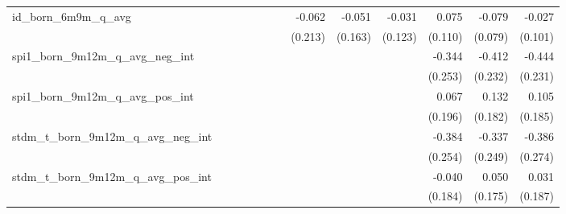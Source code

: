 \begin{tabular}{lrrrrrrrrrrrr}
id\_born\_6m9m\_q\_avg                      &              &              &              &              &              &              &       -0.062 &       -0.051 &       -0.031 &        0.075 &       -0.079 &       -0.027 \\ 
                                            &              &              &              &              &              &              &      (0.213) &      (0.163) &      (0.123) &      (0.110) &      (0.079) &      (0.101) \\ 
spi1\_born\_9m12m\_q\_avg\_neg\_int         &              &              &              &              &              &              &              &              &              &       -0.344 &       -0.412 &       -0.444 \\ 
                                            &              &              &              &              &              &              &              &              &              &      (0.253) &      (0.232) &      (0.231) \\ 
spi1\_born\_9m12m\_q\_avg\_pos\_int         &              &              &              &              &              &              &              &              &              &        0.067 &        0.132 &        0.105 \\ 
                                            &              &              &              &              &              &              &              &              &              &      (0.196) &      (0.182) &      (0.185) \\ 
stdm\_t\_born\_9m12m\_q\_avg\_neg\_int      &              &              &              &              &              &              &              &              &              &       -0.384 &       -0.337 &       -0.386 \\ 
                                            &              &              &              &              &              &              &              &              &              &      (0.254) &      (0.249) &      (0.274) \\ 
stdm\_t\_born\_9m12m\_q\_avg\_pos\_int      &              &              &              &              &              &              &              &              &              &       -0.040 &        0.050 &        0.031 \\ 
                                            &              &              &              &              &              &              &              &              &              &      (0.184) &      (0.175) &      (0.187) \\ 

\end{tabular}
